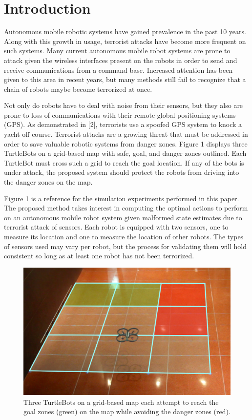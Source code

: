 \documentclass[conference]{IEEEtran}
\begin{document}
\section{Introduction}
Autonomous mobile robotic systems have gained prevalence in the past 10 years. Along with this
growth in usage, terrorist attacks have become more frequent on such systems.
Many current autonomous mobile robot systems are prone to attack given the wireless interfaces present
on the robots in order to send and receive communications from a command base. Increased attention has
been given to this area in recent years, but many methods still fail to recognize that a chain of robots
maybe become terrorized at once.
\par
Not only do robots have to deal with noise from their sensors, but they also are prone to loss of communications
with their remote global positioning systems (GPS). As demonstrated in [2], terrorists use a spoofed GPS system
to knock a yacht off course. Terrorist attacks are a growing threat that must be addressed in order to save
valuable robotic systems from danger zones. Figure 1 displays three TurtleBots on a grid-based map with safe,
goal, and danger zones outlined. Each TurtleBot must cross such a grid to reach the goal location. If any of
the bots is under attack, the proposed system should protect the robots from driving into the danger zones on the map.
\par 
Figure 1 is a reference for the simulation experiments performed in this paper. The proposed method takes
interest in computing the optimal actions to perform on an autonomous mobile robot system given malformed
state estimates due to terrorist attack of sensors. Each robot is equipped with two sensors, one to measure
its location and one to measure the location of other robots. The types of sensors used may vary per robot,
but the process for validating them will hold consistent so long as at least one robot has not been terrorized.
\par
\begin{figure}[!ht]
  \centering
    \includegraphics[scale=.2]{figure1}
  \caption{Three TurtleBots on a grid-based map each attempt to reach the goal zones (green) on the map
  while avoiding the danger zones (red).}
\end{figure}
\end{document}
